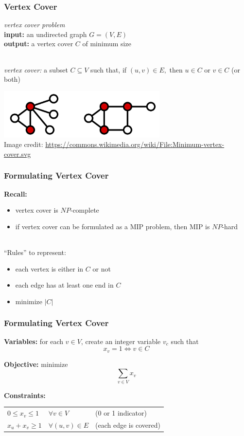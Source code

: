 \documentclass{beamer}
\newcommand{\stanza}{ \\~\ }
\begin{document}
\begin{frame} \frametitle{Vertex Cover}
  \emph{vertex cover problem} \\
  \textbf{input:} an undirected graph $G=(V, E)$ \\
  \textbf{output:} a vertex cover $C$ of minimum size
  \stanza

  \emph{vertex cover:} a subset $C \subseteq V$ such that, if $(u, v) \in E,$ then $u \in C$ or $v \in C$ (or both)
 
  \begin{center}
    \includegraphics[height=1in]{vertex-cover.png} \\
    {\tiny Image credit: \url{https://commons.wikimedia.org/wiki/File:Minimum-vertex-cover.svg} }
  \end{center}

\end{frame}

\begin{frame} \frametitle{Formulating Vertex Cover}
  \textbf{Recall:}
  \begin{itemize}
    \item vertex cover is $NP$-complete
    \item if vertex cover can be formulated as a MIP problem, then MIP is $NP$-hard
    \stanza
  \end{itemize}

  ``Rules'' to represent:
    \begin{itemize}
      \item each vertex is either in $C$ or not
      \item each edge has at least one end in $C$
      \item minimize $|C|$
    \end{itemize}
\end{frame}

\begin{frame} \frametitle{Formulating Vertex Cover}
\textbf{Variables:} for each $v \in V$, create an integer variable $v_c$ such that
\[ x_v = 1 \Leftrightarrow v \in C \]

\textbf{Objective:} minimize
\[ \sum_{v \in V} x_v \]

\textbf{Constraints:}
\begin{tabular}{lll}
  $0 \leq x_v \leq 1$ & $\forall v \in V$ & (0 or 1 indicator) \\
  $x_u + x_v \geq 1$ & $\forall (u, v) \in E$ & (each edge is covered)
\end{tabular}

\end{frame}
\end{document}
